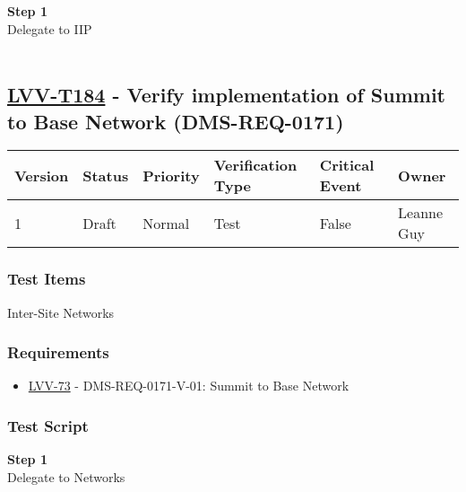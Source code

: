 \textbf{Step 1}\\
Delegate to IIP\\
~\\

\hypertarget{lvv-t184---verify-implementation-of-summit-to-base-network-dms-req-0171}{%
\subsection{\texorpdfstring{\href{https://jira.lsstcorp.org/secure/Tests.jspa\#/testCase/LVV-T184}{LVV-T184}
- Verify implementation of Summit to Base Network
(DMS-REQ-0171)}{LVV-T184 - Verify implementation of Summit to Base Network (DMS-REQ-0171)}}\label{lvv-t184---verify-implementation-of-summit-to-base-network-dms-req-0171}}

\begin{longtable}[]{@{}llllll@{}}
\toprule
Version & Status & Priority & Verification Type & Critical Event &
Owner\tabularnewline
\midrule
\endhead
1 & Draft & Normal & Test & False & Leanne Guy\tabularnewline
\bottomrule
\end{longtable}

\hypertarget{test-items-160}{%
\subsubsection{Test Items}\label{test-items-160}}

Inter-Site Networks~

\hypertarget{requirements-161}{%
\subsubsection{Requirements}\label{requirements-161}}

\begin{itemize}
\tightlist
\item
  \href{https://jira.lsstcorp.org/browse/LVV-73}{LVV-73} -
  DMS-REQ-0171-V-01: Summit to Base Network
\end{itemize}

\hypertarget{test-script-161}{%
\subsubsection{Test Script}\label{test-script-161}}

\textbf{Step 1}\\
Delegate to Networks\\
~\\

